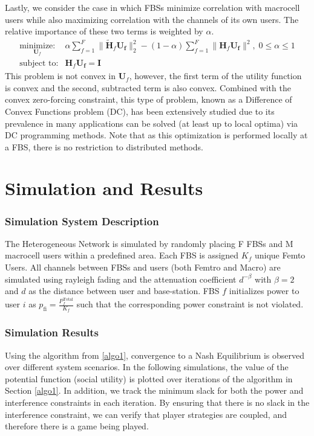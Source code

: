 \documentclass[12pt,a4paper]{report}
\begin{document}
\par
Lastly, we consider the case in which FBSs minimize correlation with macrocell users while also maximizing correlation with the channels of its own users. The relative importance of these two terms is weighted by $\alpha.$
    \begin{equation}
    \begin{array}{ll}
    \underset{\mathbf{U}_{f} }{\text{minimize:}}   & \alpha\sum^F_{f=1} \|\mathbf{\tilde{H}}_{f}  \mathbf{U_{f}}\|^2_2
    -
    (1-\alpha)\sum^F_{f=1} \|\mathbf{H}_{f}  \mathbf{U_{f}}\|^2, \; 0\leq \alpha \leq 1
    \\
    \mbox{subject to:} & \mathbf{H}_{f}  \mathbf{U_{f}} = \mathbf{I}
    \end{array}
    \label{e-opt-prob}
    \end{equation}
    This problem is not convex in $\mathbf{U}_{f}$, however, the first term of the utility function is convex and the second, subtracted term is also convex. Combined with the convex zero-forcing constraint, this type of problem, known as a Difference of Convex Functions problem (DC), has been extensively studied due to its prevalence in many applications can be solved (at least up to local optima) via DC programming methods. Note that as this optimization is performed locally at a FBS, there is no restriction to distributed methods.
     


\chapter{Simulation and Results}\label{numerical}
\subsection{Simulation System Description}
The Heterogeneous Network is simulated by randomly placing F FBSs and M macrocell users within a predefined area. Each FBS is assigned $K_{f}$ unique Femto Users. All channels between FBSs and users (both Femtro and Macro) are simulated using rayleigh fading and the attenuation coefficient $d^{- \beta}$ with $\beta =2$ and $d$ as the distance between user and base-station.
FBS $f$ initializes power to user $i$ as $p_{\mathrm{fi}} = \frac{{P_{f}^{\text{Total}}}}{K_{f}} $ such that the corresponding power constraint is not violated. 


\subsection{Simulation Results}
Using the algorithm from \ref{algo1}, convergence to a Nash Equilibrium is observed over different system scenarios. 
In the following simulations, the value of the potential function (social utility) is plotted over iterations of the algorithm in Section \ref{algo1}. In addition, we track the minimum slack for both the power and interference constraints in each iteration. By ensuring that there is no slack in the interference constraint, we can verify that player strategies are coupled, and therefore there is a game being played. 
\end{document}
